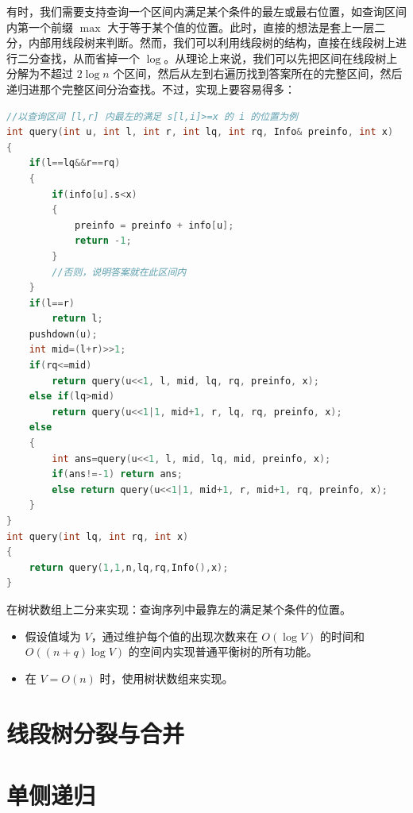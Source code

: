 有时，我们需要支持查询一个区间内满足某个条件的最左或最右位置，如查询区间内第一个前缀 $\max$ 大于等于某个值的位置。此时，直接的想法是套上一层二分，内部用线段树来判断。然而，我们可以利用线段树的结构，直接在线段树上进行二分查找，从而省掉一个 $\log$。从理论上来说，我们可以先把区间在线段树上分解为不超过 $2\log n$ 个区间，然后从左到右遍历找到答案所在的完整区间，然后递归进那个完整区间分治查找。不过，实现上要容易得多：

\begin{lstlisting}[language=C++, caption={线段树上二分}]
//以查询区间 [l,r] 内最左的满足 s[l,i]>=x 的 i 的位置为例
int query(int u, int l, int r, int lq, int rq, Info& preinfo, int x)
{
    if(l==lq&&r==rq)
    {
        if(info[u].s<x)
        {
            preinfo = preinfo + info[u];
            return -1;
        }
        //否则，说明答案就在此区间内
    }
    if(l==r)
        return l;
    pushdown(u);
    int mid=(l+r)>>1;
    if(rq<=mid)
        return query(u<<1, l, mid, lq, rq, preinfo, x);
    else if(lq>mid)
        return query(u<<1|1, mid+1, r, lq, rq, preinfo, x);
    else
    {
        int ans=query(u<<1, l, mid, lq, mid, preinfo, x);
        if(ans!=-1) return ans;
        else return query(u<<1|1, mid+1, r, mid+1, rq, preinfo, x);
    }
}
int query(int lq, int rq, int x)
{
    return query(1,1,n,lq,rq,Info(),x);
}
\end{lstlisting}

\begin{exercise}[树状数组上二分]
    在树状数组上二分来实现：查询序列中最靠左的满足某个条件的位置。
\end{exercise}

\begin{exercise}[权值线段树]
    \begin{itemize}
        \item 假设值域为 $V$，通过维护每个值的出现次数来在 $O(\log V)$ 的时间和 $O((n+q)\log V)$ 的空间内实现普通平衡树的所有功能。
        \item 在 $V=O(n)$ 时，使用树状数组来实现。
    \end{itemize}
\end{exercise}

\section{线段树分裂与合并}

\section{单侧递归}

